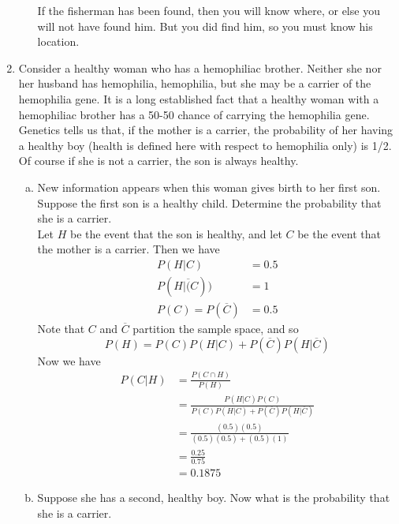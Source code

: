 \documentclass{scrartcl}
\begin{document}
\begin{enumerate}
\begin{enumerate}[a)]
If the fisherman has been found, then you will know where, or else you will not have found him. But you did find him, so you must know his location.
\end{enumerate}

\item Consider a healthy woman who has a hemophiliac brother. Neither she nor her husband has hemophilia, hemophilia, but she may be a carrier of the hemophilia gene. It is a long established fact that a healthy woman with a hemophiliac brother has a 50-50 chance of carrying the hemophilia gene. Genetics tells us that, if the mother is a carrier, the probability of her having a healthy boy (health is defined here with respect to hemophilia only) is 1/2. Of course if she is not a carrier, the son is always healthy.\\

\begin{enumerate}[a)]
  \item New information appears when this woman gives birth to her first son. Suppose the first son is a healthy child. Determine the probability that she is a carrier.\\

    Let $H$ be the event that the son is healthy, and let $C$ be the event that the mother is a carrier. Then we have
    \begin{align*}
      P(H|C) &= 0.5\\
      P(H|\overline(C)) &= 1\\
      P(C) = P(\overline{C}) &= 0.5
    \end{align*}
Note that $C$ and $\overline{C}$ partition the sample space, and so $$P(H) = P(C)P(H|C) + P(\overline{C})P(H|\overline{C})$$ Now we have
    \begin{align*}
      P(C|H) &= \frac{P(C \cap H)}{P(H)}\\
             &= \frac{P(H|C)P(C)}{P(C)P(H|C) + P(\overline{C})P(H|\overline{C})}\\
             &= \frac{(0.5)(0.5)}{(0.5)(0.5) + (0.5)(1)}\\
             &= \frac{0.25}{0.75}\\
             &= 0.1875
    \end{align*}

    \item Suppose she has a second, healthy boy. Now what is the probability that she is a carrier.\\


\end{enumerate}
\end{enumerate}
\end{document}
